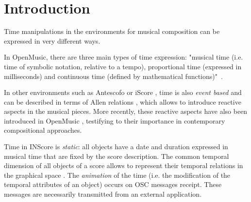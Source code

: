 \documentclass{article}
\title{\papertitle}
\begin{document}
%
\capstartfalse
\maketitle
\capstarttrue
%
\begin{abstract}
INScore is an environment for augmented interactive music score design turned towards unconventional uses of music notation, without excluding conventional approaches. In this environment, although all the objects of a score have a temporal dimension, the time remains \emph{fixed} i.e. the date (or duration) of an object does not change, except on message reception (sent from an external application or resulting from events handling). Thus, INScore does not include a time manager in the classic sense of the term.
This choice was based on the fact that the system was originally designed for uses coupled with sound production software (e.g. Max/MSP, Pure Data), that have more strict real-time constraints than INScore's graphical environment.
However, the need to introduce dynamic time has gradually emerged, leading to an original model, both \emph{continuous} and  \emph{event based}. The paper presents this model and its properties in the environment of INScore.
\end{abstract}
%


\section{Introduction}\label{sec:introduction}
Time manipulations in the environments for musical composition can be expressed in very different ways.

In OpenMusic, there are three main types of time expression: "musical time (i.e. time of symbolic notation, relative to a tempo), proportional time (expressed in milliseconds) and continuous time (defined by mathematical functions)"~\cite{bresson08}.

In other environments such as Antescofo \cite{acont08} or iScore \cite{AllombertDA08}, time is also \textit{event based} and can be described in terms of Allen relations \cite{Allen:1983:MKT:182.358434}, which allows to introduce reactive aspects in the musical pieces.
More recently, these reactive aspects have also been introduced in OpenMusic \cite{bresson:hal-00965747}, testifying to their importance in contemporary compositional approaches.

Time in INScore \cite{Fober:12a} is \emph{static}: all objects have a date and duration expressed in musical time that are fixed by the score description. The common temporal dimension of all objects of a score allows to represent their temporal relations in the graphical space \cite{fober:10b}. The \emph{animation} of the time (i.e. the modification of the temporal attributes of an object) occurs on OSC messages receipt. These messages are necessarily transmitted from an external application.
\end{document}
